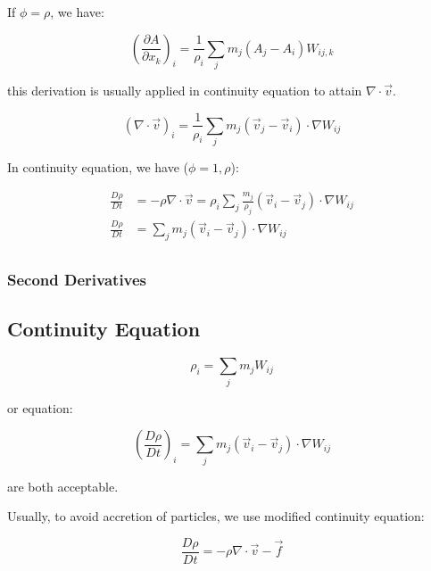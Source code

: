 \documentclass[10pt, oneside]{article}
\begin{document}
If $\phi=\rho$, we have:

\begin{equation}
    \left(
        \frac{\partial A}{\partial x_k}
    \right)_i = \frac{1}{\rho_i}\sum_j m_j (A_j-A_i)W_{ij,k}
\end{equation}

this derivation is usually applied in continuity equation to attain $\nabla\cdot \vec{v}$.

\begin{equation}
    (\nabla\cdot \vec{v})_i = \frac{1}{\rho_i}\sum_j m_j (\vec{v}_j-\vec{v}_i)\cdot \nabla W_{ij}
\end{equation}

In continuity equation, we have ($\phi=1,\rho$):

\begin{equation}
    \begin{aligned}
        \frac{D\rho}{Dt} &= -\rho \nabla \cdot \vec{v}=
    \rho_i\sum_j \frac{m_j}{\rho_j} (\vec{v}_i-\vec{v}_j)\cdot \nabla W_{ij}\\
    \frac{D\rho}{Dt} &= 
    \sum_j m_j (\vec{v}_i-\vec{v}_j)\cdot \nabla W_{ij}\\
    \end{aligned}
\end{equation}

\subsubsection{Second Derivatives}

\subsection{Continuity Equation}

\begin{equation}
    \rho_i = \sum_j m_j W_{ij}
\end{equation}

or equation:

\begin{equation}
    \left(\frac{D\rho}{Dt}\right)_i = 
    \sum_j m_j (\vec{v}_i-\vec{v}_j)\cdot \nabla W_{ij}
\end{equation}

are both acceptable.

Usually, to avoid accretion of particles, we use modified continuity equation:

\begin{equation}
    \frac{D\rho}{Dt}=-\rho\nabla\cdot \vec{v}-\vec{f}
\end{equation}
\end{document}
